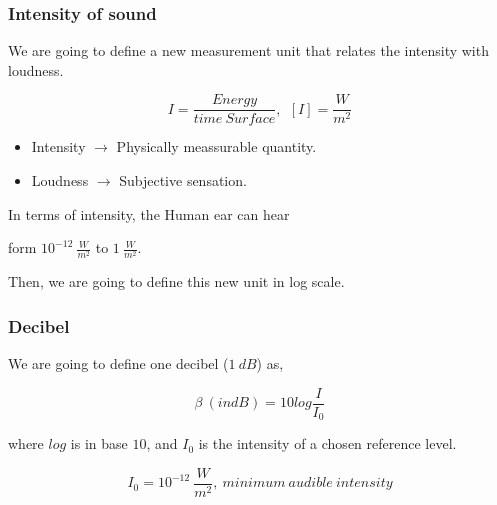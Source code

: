 \documentclass[]{beamer}
\begin{document}
\begin{frame}
\frametitle{Intensity of sound}


We are going  to define a new measurement unit that relates the intensity with loudness.
\vspace{3mm}
\pause

\begin{equation*}
I=\frac{Energy}{time~Surface}, \ \ [I]=\frac{W}{m^2}
\end{equation*}


\begin{itemize}
\item Intensity $\rightarrow$ Physically meassurable quantity.
\pause

\item Loudness $\rightarrow$ Subjective sensation. 
\end{itemize}
\pause
\vspace{3mm}

In terms of intensity, the Human ear can hear  
\vspace{3mm}
\pause

form $10^{-12}~\frac{W}{m^2}$ to $1~\frac{W}{m^2}$.

\vspace{3mm}
\pause
Then, we are going to define this new unit  in log scale.

  \end{frame}








\begin{frame}
\frametitle{Decibel}

We are going to define one decibel ($1~dB$) as,
\pause

\begin{equation}
\beta~ (in dB)=10 log\frac{I}{I_0}
\end{equation}

\pause

where $log$ is in base $10$, and $I_0$ is the intensity of a chosen reference level.
\pause

\begin{equation}
I_0=10^{-12}~\frac{W}{m^2}, \ minimum~audible~intensity
\end{equation}

  \end{frame}
\end{document}
